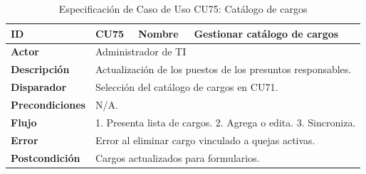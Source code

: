 \vspace{-0.4cm}

\begin{table}[ht!]
    \centering
    \caption{Especificación de Caso de Uso CU75: Catálogo de cargos}
    \label{tab:cu75}
    \begin{tabularx}{\textwidth}{|l|p{2cm}|l|X|}
        \hline
        \textbf{ID} & CU75 & \textbf{Nombre} & Gestionar catálogo de cargos \\ \hline
        \textbf{Actor} & \multicolumn{3}{X|}{Administrador de TI} \\ \hline
        \textbf{Descripción} & \multicolumn{3}{X|}{Actualización de los puestos de los presuntos responsables.} \\ \hline
        \textbf{Disparador} & \multicolumn{3}{X|}{Selección del catálogo de cargos en CU71.} \\ \hline
        \textbf{Precondiciones} & \multicolumn{3}{X|}{N/A.} \\ \hline
        \textbf{Flujo} & \multicolumn{3}{X|}{1. Presenta lista de cargos. 2. Agrega o edita. 3. Sincroniza.} \\ \hline
        \textbf{Error} & \multicolumn{3}{X|}{Error al eliminar cargo vinculado a quejas activas.} \\ \hline
        \textbf{Postcondición} & \multicolumn{3}{X|}{Cargos actualizados para formularios.} \\ \hline
    \end{tabularx}
\end{table}

\endgroup
\clearpage